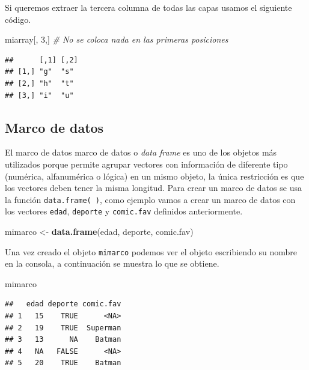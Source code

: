\documentclass[10pt,]{krantz}
\makeatletter
\newenvironment{Shaded}{\begin{snugshade}}{\end{snugshade}}
\newcommand{\KeywordTok}[1]{\textcolor[rgb]{0.13,0.29,0.53}{\textbf{#1}}}
\newcommand{\DecValTok}[1]{\textcolor[rgb]{0.00,0.00,0.81}{#1}}
\newcommand{\StringTok}[1]{\textcolor[rgb]{0.31,0.60,0.02}{#1}}
\newcommand{\CommentTok}[1]{\textcolor[rgb]{0.56,0.35,0.01}{\textit{#1}}}
\newcommand{\NormalTok}[1]{#1}
\newenvironment{kframe}{%
\medskip{}
\setlength{\fboxsep}{.8em}
 \def\at@end@of@kframe{}%
 \ifinner\ifhmode%
  \def\at@end@of@kframe{\end{minipage}}%
  \begin{minipage}{\columnwidth}%
 \fi\fi%
 \def\FrameCommand##1{\hskip\@totalleftmargin \hskip-\fboxsep
 \colorbox{shadecolor}{##1}\hskip-\fboxsep
     \hskip-\linewidth \hskip-\@totalleftmargin \hskip\columnwidth}%
 \MakeFramed {\advance\hsize-\width
   \@totalleftmargin\z@ \linewidth\hsize
   \@setminipage}}%
 {\par\unskip\endMakeFramed%
 \at@end@of@kframe}
\renewenvironment{Shaded}{\begin{kframe}}{\end{kframe}}
\makeatother
\begin{document}
Si queremos extraer la tercera columna de todas las capas usamos el
siguiente código.

\begin{Shaded}
\begin{Highlighting}[]
\NormalTok{miarray[, }\DecValTok{3}\NormalTok{,]  }\CommentTok{# No se coloca nada en las primeras posiciones}
\end{Highlighting}
\end{Shaded}

\begin{verbatim}
##      [,1] [,2]
## [1,] "g"  "s" 
## [2,] "h"  "t" 
## [3,] "i"  "u"
\end{verbatim}

\subsection{\texorpdfstring{Marco de datos 
}{Marco de datos  }}\label{marco-de-datos}

El marco de datos marco de datos o \emph{data frame} es uno de los
objetos más utilizados porque permite agrupar vectores con información
de diferente tipo (numérica, alfanumérica o lógica) en un mismo objeto,
la única restricción es que los vectores deben tener la misma longitud.
Para crear un marco de datos se usa la función \texttt{data.frame(\ )},
como ejemplo vamos a crear un marco de datos con los vectores
\texttt{edad}, \texttt{deporte} y \texttt{comic.fav} definidos
anteriormente.

\begin{Shaded}
\begin{Highlighting}[]
\NormalTok{mimarco <-}\StringTok{ }\KeywordTok{data.frame}\NormalTok{(edad, deporte, comic.fav)}
\end{Highlighting}
\end{Shaded}

Una vez creado el objeto \texttt{mimarco} podemos ver el objeto
escribiendo su nombre en la consola, a continuación se muestra lo que se
obtiene.

\begin{Shaded}
\begin{Highlighting}[]
\NormalTok{mimarco}
\end{Highlighting}
\end{Shaded}

\begin{verbatim}
##   edad deporte comic.fav
## 1   15    TRUE      <NA>
## 2   19    TRUE  Superman
## 3   13      NA    Batman
## 4   NA   FALSE      <NA>
## 5   20    TRUE    Batman
\end{verbatim}
\end{document}
